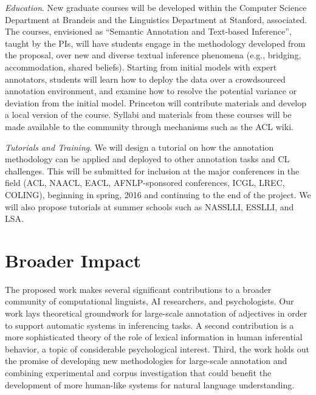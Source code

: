 \documentclass[10pt]{article}
\begin{document}
{\it Education}. New graduate courses will be developed within the Computer Science Department at Brandeis and  the Linguistics Department at Stanford, associated. The courses, envisioned as  ``Semantic Annotation and Text-based Inference'', taught by the PIs, will have students engage in the methodology developed from the proposal, over new and diverse textual inference phenomena (e.g., bridging, accommodation, shared beliefs). Starting from initial models with expert annotators, students will learn how to deploy the data over a crowdsourced  annotation environment, and examine how to resolve the potential variance or deviation from the initial model. Princeton will contribute materials and develop a local version of the course.
Syllabi and materials from these courses will be made available to the community through mechanisms such as the ACL wiki.

{\it Tutorials and Training}.
We will design a tutorial on how the annotation methodology can be applied and deployed to other annotation tasks and CL challenges. This will be submitted for inclusion at the major conferences in the field (ACL, NAACL, EACL, AFNLP-sponsored conferences, ICGL, LREC, COLING), beginning in spring, 2016 and continuing to the end of the project. We will also propose tutorials at summer schools such as NASSLLI, ESSLLI, and LSA. 

\vspace {-5mm}
\section{Broader Impact}

\vspace {-3mm}

The proposed work  makes several significant contributions to a broader community of computational linguists, AI researchers, and psychologists. 
Our work lays theoretical groundwork for large-scale annotation of adjectives in order to support automatic systems in inferencing tasks. 
A second contribution is a more sophisticated theory of the role of lexical information in human inferential behavior, a topic of considerable psychological interest.
Third, the work holds out the promise of developing new methodologies for large-scale annotation and combining experimental and corpus investigation that could benefit the development of more human-like systems for natural language understanding.
  
\end{document}
